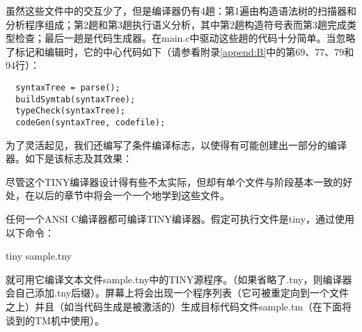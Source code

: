 \documentclass[lang=cn,10pt]{elegantbook}
\begin{document}
虽然这些文件中的交互少了，但是编译器仍有4趟：第1遍由构造语法树的扫描器和分析程序组成；第2趟和第3趟执行语义分析，其中第2趟构造符号表而第3趟完成类型检查；最后一趟是代码生成器。在main.c中驱动这些趟的代码十分简单。当忽略了标记和编辑时，它的中心代码如下（请参看附录\ref{append:B}中的第69、77、79和94行）：

\begin{lstlisting}
  syntaxTree = parse();
  buildSymtab(syntaxTree);
  typeCheck(syntaxTree);
  codeGen(syntaxTree, codefile);
\end{lstlisting}

为了灵活起见，我们还编写了条件编译标志，以使得有可能创建出一部分的编译器。如下是该标志及其效果：

\begin{center}
\end{center}

尽管这个TINY编译器设计得有些不太实际，但却有单个文件与阶段基本一致的好处，在以后的章节中将会一个一个地学到这些文件。

任何一个ANSI C编译器都可编译TINY编译器。假定可执行文件是tiny，通过使用以下命令：

tiny sample.tny

就可用它编译文本文件sample.tny中的TINY源程序。（如果省略了.tny，则编译器会自己添加.tny后缀）。屏幕上将会出现一个程序列表（它可被重定向到一个文件之上）并且（如当代码生成是被激活的）生成目标代码文件sample.tm（在下面将谈到的TM机中使用）。
\end{document}
